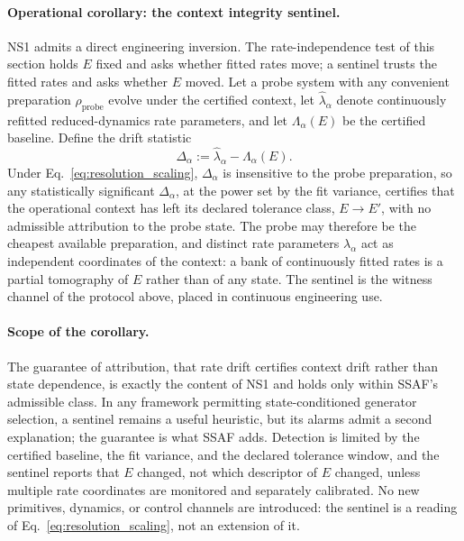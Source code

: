 \documentclass[aps,prx,onecolumn,11pt]{revtex4-2}
\theoremstyle{plain}
\theoremstyle{definition}
\theoremstyle{remark}
\begin{document}
\paragraph{Operational corollary: the context integrity sentinel.}

NS1 admits a direct engineering inversion. The rate-independence test
of this section holds \(E\) fixed and asks whether fitted rates move;
a sentinel trusts the fitted rates and asks whether \(E\) moved. Let a
probe system with any convenient preparation \(\rho_{\mathrm{probe}}\)
evolve under the certified context, let \(\hat\lambda_\alpha\) denote
continuously refitted reduced-dynamics rate parameters, and let
\(\Lambda_\alpha(E)\) be the certified baseline. Define the drift
statistic
\begin{equation}
\Delta_\alpha
:=
\hat\lambda_\alpha-\Lambda_\alpha(E).
\label{eq:sentinel_drift_statistic}
\end{equation}
Under Eq.~\eqref{eq:resolution_scaling}, \(\Delta_\alpha\) is
insensitive to the probe preparation, so any statistically significant
\(\Delta_\alpha\), at the power set by the fit variance, certifies
that the operational context has left its declared tolerance class,
\(E\to E'\), with no admissible attribution to the probe state. The
probe may therefore be the cheapest available preparation, and distinct
rate parameters \(\lambda_\alpha\) act as independent coordinates of
the context: a bank of continuously fitted rates is a partial
tomography of \(E\) rather than of any state. The sentinel is the
witness channel of the protocol above, placed in continuous engineering
use.

\paragraph{Scope of the corollary.}

The guarantee of attribution, that rate drift certifies context drift
rather than state dependence, is exactly the content of NS1 and holds
only within SSAF's admissible class. In any framework permitting
state-conditioned generator selection, a sentinel remains a useful
heuristic, but its alarms admit a second explanation; the guarantee is
what SSAF adds. Detection is limited by the certified baseline, the fit
variance, and the declared tolerance window, and the sentinel reports
that \(E\) changed, not which descriptor of \(E\) changed, unless
multiple rate coordinates are monitored and separately calibrated. No
new primitives, dynamics, or control channels are introduced: the
sentinel is a reading of Eq.~\eqref{eq:resolution_scaling}, not an
extension of it.
\end{document}
